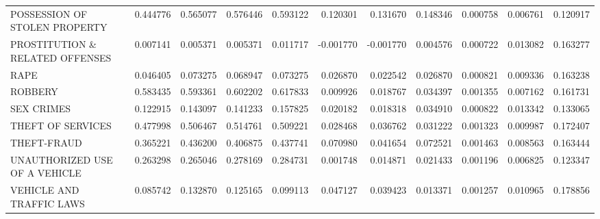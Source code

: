 \begin{tabular}{lrrrrrrrrrr}
POSSESSION OF STOLEN PROPERTY   &     0.444776 &  0.565077 &   0.576446 &   0.593122 &     0.120301 &        0.131670 &        0.148346 &  0.000758 &     0.006761 &     0.120917 \\
PROSTITUTION \& RELATED OFFENSES &     0.007141 &  0.005371 &   0.005371 &   0.011717 &    -0.001770 &       -0.001770 &        0.004576 &  0.000722 &     0.013082 &     0.163277 \\
RAPE                            &     0.046405 &  0.073275 &   0.068947 &   0.073275 &     0.026870 &        0.022542 &        0.026870 &  0.000821 &     0.009336 &     0.163238 \\
ROBBERY                         &     0.583435 &  0.593361 &   0.602202 &   0.617833 &     0.009926 &        0.018767 &        0.034397 &  0.001355 &     0.007162 &     0.161731 \\
SEX CRIMES                      &     0.122915 &  0.143097 &   0.141233 &   0.157825 &     0.020182 &        0.018318 &        0.034910 &  0.000822 &     0.013342 &     0.133065 \\
THEFT OF SERVICES               &     0.477998 &  0.506467 &   0.514761 &   0.509221 &     0.028468 &        0.036762 &        0.031222 &  0.001323 &     0.009987 &     0.172407 \\
THEFT-FRAUD                     &     0.365221 &  0.436200 &   0.406875 &   0.437741 &     0.070980 &        0.041654 &        0.072521 &  0.001463 &     0.008563 &     0.163444 \\
UNAUTHORIZED USE OF A VEHICLE   &     0.263298 &  0.265046 &   0.278169 &   0.284731 &     0.001748 &        0.014871 &        0.021433 &  0.001196 &     0.006825 &     0.123347 \\
VEHICLE AND TRAFFIC LAWS        &     0.085742 &  0.132870 &   0.125165 &   0.099113 &     0.047127 &        0.039423 &        0.013371 &  0.001257 &     0.010965 &     0.178856 \\
\bottomrule
\end{tabular}
